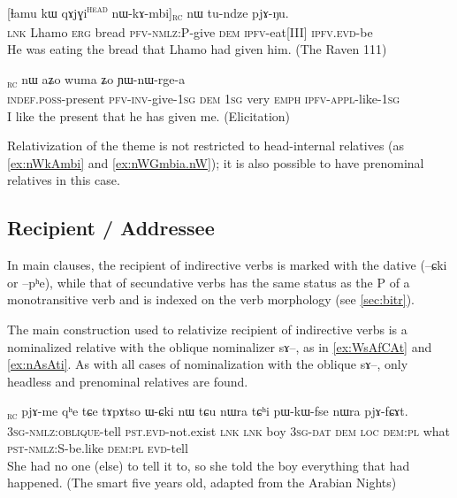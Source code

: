 \documentclass[oldfontcommands,oneside,a4paper,11pt]{article}
\newcommand{\ipa}[1]{{\phon #1}} %
\newcommand{\topic}{\textsc{dem}}
\newcommand{\tete}{\textsuperscript{\textsc{head}}}
\newcommand{\rc}{\textsubscript{\textsc{rc}}}
\begin{document}
\begin{exe}
\ex \label{ex:nWkAmbi}
\gll      \ipa{tɕe} 	[\ipa{ɬamu} 	\ipa{kɯ} 	\ipa{qɤjɣi}\tete{} 	\ipa{nɯ-kɤ-mbi}]\rc{} 	\ipa{nɯ} 	\ipa{tu-ndze} 	\ipa{pjɤ-ŋu.}   \\
\textsc{lnk} Lhamo \textsc{erg} bread \textsc{pfv-nmlz}:P-give \topic{} \textsc{ipfv}-eat[III] \textsc{ipfv.evd}-be  \\
 \glt    He was eating the bread that Lhamo had given him. (The Raven 111)
\end{exe} 

      \begin{exe}
   \ex \label{ex:nWGmbia.nW}
 \gll  [\ipa{tɤ-pɤro}\tete{}  	\ipa{nɯ́-wɣ-mbi-a}]\rc{}  	\ipa{nɯ}  	\ipa{aʑo}  	\ipa{wuma}  	\ipa{ʑo}  	\ipa{ɲɯ-nɯ-rge-a}  	 \\
 \textsc{indef.poss}-present \textsc{pfv-inv}-give-\textsc{1sg} \topic{} \textsc{1sg} very \textsc{emph} \textsc{ipfv-appl}-like-\textsc{1sg}   \\
\glt  I like the present that he has given me. (Elicitation)
\end{exe}


Relativization of the theme is not restricted to head-internal relatives  (as  \ref{ex:nWkAmbi} and \ref{ex:nWGmbia.nW}); it is also possible to have prenominal relatives in this case.

\subsection{Recipient / Addressee}

In main clauses, the recipient of indirective verbs is marked with the dative (\ipa{--ɕki} or \ipa{--pʰe}), while that of secundative verbs has the same status as the P of a monotransitive verb and is indexed on the verb morphology (see \ref{sec:bitr}).

The main construction used to relativize recipient of indirective verbs is a nominalized  relative with the oblique nominalizer \ipa{sɤ}--, as in \ref{ex:WsAfCAt} and \ref{ex:nAsAti}. As with all cases of nominalization with the oblique \ipa{sɤ}--, only headless and prenominal relatives are found.


\begin{exe}
\ex \label{ex:WsAfCAt}
\gll
[\ipa{ɯ-sɤ-fɕɤt}]\rc{} 
\ipa{pjɤ-me} 	\ipa{qʰe} 	\ipa{tɕe} 	\ipa{tɤpɤtso} 	\ipa{ɯ-ɕki} 	\ipa{nɯ} 	\ipa{tɕu} 	\ipa{nɯra} 	\ipa{tɕʰi} 	\ipa{pɯ-kɯ-fse} 	\ipa{nɯra} 	\ipa{pjɤ-fɕɤt.} \\
\textsc{3sg-nmlz:oblique}-tell \textsc{pst.evd}-not.exist \textsc{lnk} \textsc{lnk} boy \textsc{3sg-dat} \textsc{dem} \textsc{loc} \textsc{dem:pl} what \textsc{pst-nmlz:S}-be.like  \textsc{dem:pl} \textsc{evd}-tell \\
\glt She had no one (else) to tell it to, so she told the boy everything that had happened. (The smart five years old, adapted from the Arabian Nights)
\end{exe} 
\end{document}
